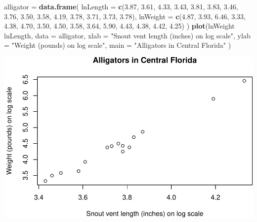 \documentclass[]{article}
\newenvironment{Shaded}{\begin{snugshade}}{\end{snugshade}}
\newcommand{\KeywordTok}[1]{\textcolor[rgb]{0.13,0.29,0.53}{\textbf{{#1}}}}
\newcommand{\DataTypeTok}[1]{\textcolor[rgb]{0.13,0.29,0.53}{{#1}}}
\newcommand{\FloatTok}[1]{\textcolor[rgb]{0.00,0.00,0.81}{{#1}}}
\newcommand{\StringTok}[1]{\textcolor[rgb]{0.31,0.60,0.02}{{#1}}}
\newcommand{\NormalTok}[1]{{#1}}
\begin{document}
\begin{Shaded}
\begin{Highlighting}[]
\NormalTok{alligator =}\StringTok{ }\KeywordTok{data.frame}\NormalTok{(}
  \DataTypeTok{lnLength =} \KeywordTok{c}\NormalTok{(}\FloatTok{3.87}\NormalTok{, }\FloatTok{3.61}\NormalTok{, }\FloatTok{4.33}\NormalTok{, }\FloatTok{3.43}\NormalTok{, }\FloatTok{3.81}\NormalTok{, }\FloatTok{3.83}\NormalTok{, }\FloatTok{3.46}\NormalTok{, }\FloatTok{3.76}\NormalTok{,}
    \FloatTok{3.50}\NormalTok{, }\FloatTok{3.58}\NormalTok{, }\FloatTok{4.19}\NormalTok{, }\FloatTok{3.78}\NormalTok{, }\FloatTok{3.71}\NormalTok{, }\FloatTok{3.73}\NormalTok{, }\FloatTok{3.78}\NormalTok{),}
  \DataTypeTok{lnWeight =} \KeywordTok{c}\NormalTok{(}\FloatTok{4.87}\NormalTok{, }\FloatTok{3.93}\NormalTok{, }\FloatTok{6.46}\NormalTok{, }\FloatTok{3.33}\NormalTok{, }\FloatTok{4.38}\NormalTok{, }\FloatTok{4.70}\NormalTok{, }\FloatTok{3.50}\NormalTok{, }\FloatTok{4.50}\NormalTok{,}
    \FloatTok{3.58}\NormalTok{, }\FloatTok{3.64}\NormalTok{, }\FloatTok{5.90}\NormalTok{, }\FloatTok{4.43}\NormalTok{, }\FloatTok{4.38}\NormalTok{, }\FloatTok{4.42}\NormalTok{, }\FloatTok{4.25}\NormalTok{)}
\NormalTok{)}
\KeywordTok{plot}\NormalTok{(lnWeight ~}\StringTok{ }\NormalTok{lnLength, }\DataTypeTok{data =} \NormalTok{alligator,}
  \DataTypeTok{xlab =} \StringTok{"Snout vent length (inches) on log scale"}\NormalTok{,}
  \DataTypeTok{ylab =} \StringTok{"Weight (pounds) on log scale"}\NormalTok{,}
  \DataTypeTok{main =} \StringTok{"Alligators in Central Florida"}
\NormalTok{)}
\end{Highlighting}
\end{Shaded}

\includegraphics{rentersAndOwners_files/figure-latex/unnamed-chunk-3-1.pdf}
\end{document}

